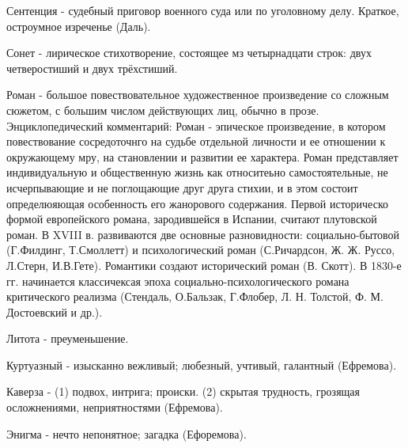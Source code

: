 



Сентенция - судебный приговор военного суда или по уголовному делу. Краткое, остроумное изреченье (Даль).

Сонет - лирическое стихотворение, состоящее мз четырнадцати строк: двух четверостиший и двух трёхстиший.

Роман - большое повествовательное художественное произведение со сложным сюжетом, с большим числом действующих лиц, обычно в прозе.
Энциклопедический комментарий:
Роман - эпическое произведение, в котором повествование сосредоточнго на судьбе отдельной личности и ее отношении к окружающему мру, на становлении и развитии ее характера. Роман представляет индивидуальную и общественную жизнь как относитеьно самостоятельные, не исчерпывающие и не поглощающие друг друга стихии, и в этом состоит определюяющая особенность его жанорового содержания. Первой историческо формой европейского романа, зародившейся в  Испании, считают плутовской роман. В XVIII в. развиваются две основные разновидности: социально-бытовой (Г.Филдинг, Т.Смоллетт) и психологический роман (С.Ричардсон, Ж. Ж. Руссо, Л.Стерн, И.В.Гете). Романтики создают исторический роман (В. Скотт). В 1830-е гг. начинается классичексая эпоха социально-психологического романа критического реализма (Стендаль, О.Бальзак, Г.Флобер, Л. Н. Толстой, Ф. М. Достоевский и др.).

Литота - преуменьшение.

Куртуазный - изысканно вежливый; любезный, учтивый, галантный (Ефремова).

Каверза - (1) подвох, интрига; происки. (2) скрытая трудность, грозящая осложнениями, неприятностями (Ефремова).

Энигма - нечто непонятное; загадка (Ефоремова).

